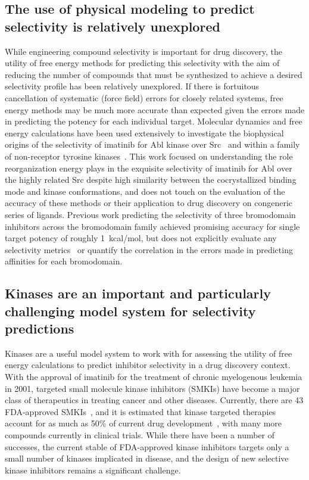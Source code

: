 \documentclass[phd,tocprelim]{cornell}
\begin{document}
\subsection{The use of physical modeling to predict selectivity is relatively unexplored}
While engineering compound selectivity is important for drug discovery, the utility of free energy methods for predicting this selectivity with the aim of reducing the number of compounds that must be synthesized to achieve a desired selectivity profile has been relatively unexplored. 
If there is fortuitous cancellation of systematic (force field) errors for closely related systems, free energy methods may be much more accurate than expected given the errors made in predicting the potency for each individual target. 
Molecular dynamics and free energy calculations have been used extensively to investigate the biophysical origins of the selectivity of imatinib for Abl kinase over Src~\citep{Lin2013-ft,Lin2014-iv} and within a family of non-receptor tyrosine kinases~\citep{Lin2013-mu}. This work focused on understanding the role reorganization energy plays in the exquisite selectivity of imatinib for Abl over the highly related Src despite high similarity between the cocrystallized binding mode and kinase conformations, and does not touch on the evaluation of the accuracy of these methods or their application to drug discovery on congeneric series of ligands. 
Previous work predicting the selectivity of three bromodomain inhibitors across the bromodomain family achieved promising accuracy for single target potency of roughly 1~kcal/mol, but does not explicitly evaluate any selectivity metrics~\citep{Aldeghi2017-ox} or quantify the correlation in the errors made in predicting affinities for each bromodomain. 


\subsection{Kinases are an important and particularly challenging model system for selectivity predictions}
Kinases are a useful model system to work with for assessing the utility of free energy calculations to predict inhibitor selectivity in a drug discovery context. 
With the approval of imatinib for the treatment of chronic myelogenous leukemia in 2001, targeted small molecule kinase inhibitors (SMKIs) have become a major class of therapeutics in treating cancer and other diseases. 
Currently, there are 43 FDA-approved SMKIs~\citep{fda-approved-kinase-inhibitors}, and it is estimated that kinase targeted therapies account for as much as 50\% of current drug development~\citep{Santos:Nat.Rev.DrugDiscov.:2016}, with many more compounds currently in clinical trials. 
While there have been a number of successes, the current stable of FDA-approved kinase inhibitors targets only a small number of kinases implicated in disease, and the design of new selective kinase inhibitors remains a significant challenge.
\end{document}

